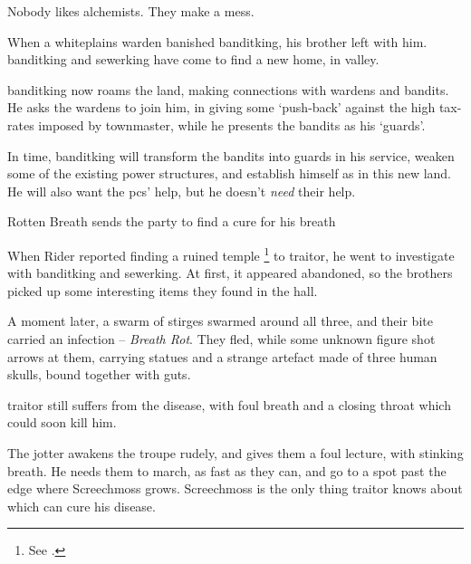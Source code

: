 \label{entitlement}

\begin{exampletext}
  \noindent
  Nobody likes alchemists.
  They make a mess.

  When a \gls{whiteplains} \gls{warden} banished \gls{banditking}, his brother left with him.
  \Gls{banditking} and \gls{sewerking} have come to find a new home, in \gls{valley}.

  \Gls{banditking} now roams the land, making connections with \glspl{warden} and bandits.
  He asks the \glspl{warden} to join him, in giving some `push-back' against the high tax-rates imposed by \gls{townmaster}, while he presents the bandits as his `guards'.
\end{exampletext}

In time, \gls{banditking} will transform the bandits into \glspl{guard} in his service, weaken some of the existing power structures, and establish himself as  in this new land.
He will also want the \glspl{pc}' help, but he doesn't \emph{need} their help.

{Rotten Breath}%
{ sends the party to find a cure for his breath}%
\label{rottenBreath}

\begin{exampletext}
  When  Rider reported finding a ruined temple%
  \footnote{See .}
  to \gls{traitor}, he went to investigate with \gls{banditking} and \gls{sewerking}.
  At first, it appeared abandoned, so the brothers picked up some interesting items they found in the hall.

  A moment later, a swarm of stirges swarmed around all three, and their bite carried an infection -- \textit{Breath Rot}.
  They fled, while some unknown figure shot arrows at them, carrying statues and a strange \gls{artefact} made of three human skulls, bound together with guts.

  \Gls{traitor} still suffers from the disease, with foul breath and a closing throat which could soon kill him.
\end{exampletext}

\noindent
The \gls{jotter} awakens the troupe rudely, and gives them a foul lecture, with stinking breath.
He needs them to march, as fast as they can, and go to a spot past the \gls{edge} where Screechmoss%
grows.
Screechmoss is the only thing \gls{traitor} knows about which can cure his disease.

